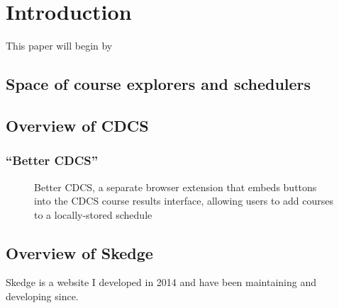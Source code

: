 
\chapter{Introduction}

This paper will begin by 

\section{Space of course explorers and schedulers}


\section{Overview of CDCS}

\label{fig:cdcs-index}

\subsection{``Better CDCS''}

\begin{figure}[ht]
    \centering
    \caption{Better CDCS, a separate browser extension that embeds buttons into the CDCS course results interface, allowing users to add courses to a locally-stored schedule}
    \label{fig:cdcs-better}
\end{figure}


\section{Overview of Skedge}

Skedge is a website I developed in 2014 and have been maintaining and developing since.

